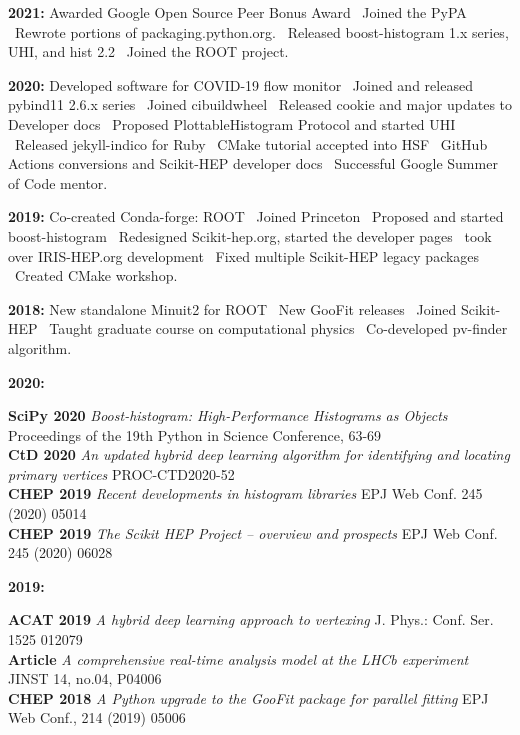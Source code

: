 \documentclass[10pt,letterpaper,english]{moderncv}
\begin{document}

\textbf{2021:} Awarded Google Open Source Peer Bonus Award \bullet\ Joined the PyPA \bullet\ Rewrote portions of packaging.python.org. \bullet\ Released boost-histogram 1.x series, UHI, and hist 2.2 \bullet\ Joined the ROOT project.

\textbf{2020:} Developed software for COVID-19 flow monitor \bullet\ Joined and released pybind11 2.6.x series \bullet\ Joined cibuildwheel \bullet\ Released cookie and major updates to Developer docs \bullet\ Proposed PlottableHistogram Protocol and started UHI \bullet\ Released jekyll-indico for Ruby \bullet\ CMake tutorial accepted into HSF \bullet\ GitHub Actions conversions and Scikit-HEP developer docs \bullet\ Successful Google Summer of Code mentor.

\textbf{2019:} Co-created Conda-forge: ROOT \bullet\ Joined Princeton \bullet\ Proposed and started boost-histogram \bullet\ Redesigned Scikit-hep.org, started the developer pages \bullet\ took over IRIS-HEP.org development \bullet\ Fixed multiple Scikit-HEP legacy packages \bullet\ Created CMake workshop.

\textbf{2018:} New standalone Minuit2 for ROOT \bullet\ New GooFit releases \bullet\ Joined Scikit-HEP \bullet\ Taught graduate course on computational physics \bullet\ Co-developed pv-finder algorithm.


\begin{minipage}[t]{.065\textwidth}
\textbf{2020:}\\
\end{minipage}%
\begin{minipage}[t]{.935\textwidth}
\textbf{SciPy 2020} \emph{Boost-histogram: High-Performance Histograms as Objects} Proceedings of the 19th Python in Science Conference, 63-69 \\
\textbf{CtD 2020}   \emph{An updated hybrid deep learning algorithm for identifying and locating primary vertices} PROC-CTD2020-52 \\
\textbf{CHEP 2019}  \emph{Recent developments in histogram libraries} EPJ Web Conf. 245 (2020) 05014 \\
\textbf{CHEP 2019}  \emph{The Scikit HEP Project -- overview and prospects} EPJ Web Conf. 245 (2020) 06028
\end{minipage}

\begin{minipage}[t]{.065\textwidth}
\textbf{2019:}\\
\end{minipage}%
\begin{minipage}[t]{.935\textwidth}
\textbf{ACAT 2019} \emph{A hybrid deep learning approach to vertexing} J. Phys.: Conf. Ser. 1525 012079 \\ 
\textbf{Article}   \emph{A comprehensive real-time analysis model at the LHCb experiment} JINST 14, no.04, P04006 \\
\textbf{CHEP 2018} \emph{A Python upgrade to the GooFit package for parallel fitting} EPJ Web Conf., 214 (2019) 05006
\end{minipage}
\end{document}
